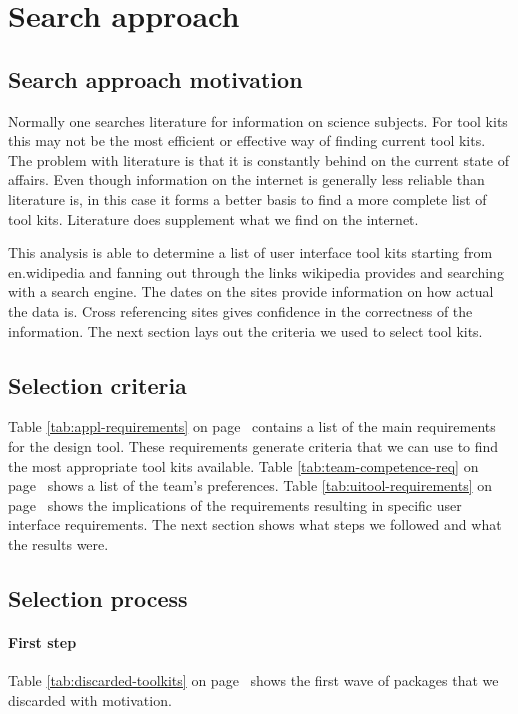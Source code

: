 \section{Search approach}

\subsection{Search approach motivation}

Normally one searches literature for information on science subjects.  For tool
kits this may not be the most efficient or effective way of finding current
tool kits. The problem with literature is that it is constantly behind on the
current state of affairs. Even though information on the internet is generally
less reliable than literature is, in this case it forms a better basis to find
a more complete list of tool kits. Literature does supplement what we find on
the internet.

This analysis is able to determine a list of user interface tool kits starting
from en.widipedia and fanning out through the links wikipedia provides and
searching with a search engine. The dates on the sites provide information on
how actual the data is. Cross referencing sites gives confidence in the
correctness of the information. The next section lays out the criteria we used
to select tool kits.

\subsection{Selection criteria}

Table \ref{tab:appl-requirements} on page~\pageref{tab:appl-requirements}
contains a list of the main requirements for the design tool. These
requirements generate criteria that we can use to find the most appropriate
tool kits available.  Table \ref{tab:team-competence-req} on
page~\pageref{tab:team-competence-req} shows a list of the team's preferences.
Table \ref{tab:uitool-requirements} on page~\pageref{tab:uitool-requirements}
shows the implications of the requirements resulting in specific user interface
requirements. The next section shows what steps we followed and what the
results were.

\subsection{Selection process}

\paragraph{First step} Table \ref{tab:discarded-toolkits} on
page~\pageref{tab:discarded-toolkits} shows the first wave of packages that we
discarded with motivation. 


